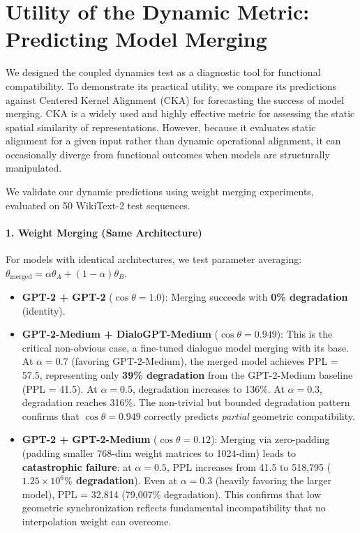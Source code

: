 \documentclass[10pt]{article} %
\theoremstyle{plain}
\theoremstyle{definition}
\theoremstyle{remark}
\begin{document}
\section{Utility of the Dynamic Metric: Predicting Model Merging}

We designed the coupled dynamics test as a diagnostic tool for functional compatibility. To demonstrate its practical utility, we compare its predictions against Centered Kernel Alignment (CKA) \citep{kornblith2019similarity} for forecasting the success of model merging. CKA is a widely used and highly effective metric for assessing the static spatial similarity of representations. However, because it evaluates static alignment for a given input rather than dynamic operational alignment, it can occasionally diverge from functional outcomes when models are structurally manipulated.

We validate our dynamic predictions using weight merging experiments, evaluated on 50 WikiText-2 test sequences.

\paragraph{1. Weight Merging (Same Architecture)}
For models with identical architectures, we test parameter averaging: $\theta_{\text{merged}} = \alpha \theta_A + (1-\alpha) \theta_B$.
\begin{itemize}
    \item \textbf{GPT-2 + GPT-2} ($\cos \theta = 1.0$): Merging succeeds with \textbf{0\% degradation} (identity).
    \item \textbf{GPT-2-Medium + DialoGPT-Medium} ($\cos \theta = 0.949$): This is the critical non-obvious case, a fine-tuned dialogue model merging with its base. At $\alpha = 0.7$ (favoring GPT-2-Medium), the merged model achieves PPL = 57.5, representing only \textbf{39\% degradation} from the GPT-2-Medium baseline (PPL = 41.5). At $\alpha = 0.5$, degradation increases to 136\%. At $\alpha = 0.3$, degradation reaches 316\%. The non-trivial but bounded degradation pattern confirms that $\cos \theta = 0.949$ correctly predicts \textit{partial} geometric compatibility.
    \item \textbf{GPT-2 + GPT-2-Medium} ($\cos \theta = 0.12$): Merging via zero-padding (padding smaller 768-dim weight matrices to 1024-dim) leads to \textbf{catastrophic failure}: at $\alpha = 0.5$, PPL increases from 41.5 to 518,795 (\textbf{$1.25 \times 10^6\%$ degradation}). Even at $\alpha = 0.3$ (heavily favoring the larger model), PPL = 32,814 (79,007\% degradation). This confirms that low geometric synchronization reflects fundamental incompatibility that no interpolation weight can overcome.
\end{itemize}
\end{document}
